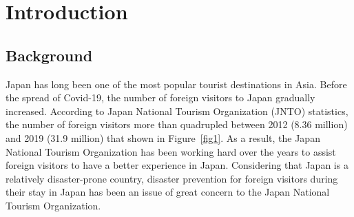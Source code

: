 \chapter{Introduction}

\section{Background}
Japan has long been one of the most popular tourist destinations in Asia. Before the spread of Covid-19, the number of foreign visitors to Japan gradually increased. According to Japan National Tourism Organization (JNTO) statistics, the number of foreign visitors more than quadrupled between 2012 (8.36 million) and 2019 (31.9 million) that shown in Figure~\ref{fig1}. As a result, the Japan National Tourism Organization has been working hard over the years to assist foreign visitors to have a better experience in Japan. Considering that Japan is a relatively disaster-prone country, disaster prevention for foreign visitors during their stay in Japan has been an issue of great concern to the Japan National Tourism Organization.

